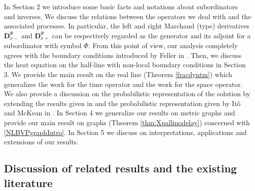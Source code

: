 \documentclass[11pt,a4paper]{article}
\theoremstyle{plain}
\theoremstyle{definition}
\theoremstyle{remark}
\begin{document}
	In Section 2 we introduce some basic facts and notations about subordinators and inverses. We discuss the relations between the operators we deal with and the associated processes. In particular, the left and right Marchaud (type) derivatives $\mathbf{D}^\Phi_{x-}$ and $\mathbf{D}^\Phi_{x+}$ can be respectively regarded as the generator and its adjoint for a subordinator with symbol $\Phi$. From this point of view, our analysis completely agrees with the boundary conditions introduced by Feller in \cite{feller1952parabolic}. Then, we discuss the heat equation on the half-line with non-local boundary conditions in Section 3. We provide the main result on the real line (Theorem \ref{fracdyntm}) which generalizes the work \cite{d2022fractionalsticky} for the time operator and the work \cite{feller1952parabolic} for the space operator. We also provide a discussion on the probabilistic representation of the solution by extending the results given in \cite{d2022fractional,d2022fractionalsticky} and the probabilistic representation given by It\^{o} and McKean in \cite{ito1996diffusion, ito1963brownian}. In Section 4 we generalize our results on metric graphs and provide our main result on graphs (Theorem \ref{thm:Xpallinodelay}) concerned with \eqref{NLBVPgraphIntro}. In Section 5 we discuss on interpretations, applications and extensions of our results. 
	
	\subsection{Discussion of related results and the existing literature}
	
\end{document}
